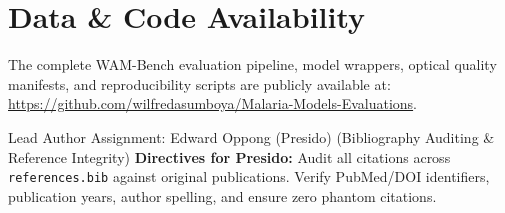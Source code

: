 \documentclass[a4paper,11pt]{article}
\begin{document}
\section*{Data \& Code Availability}
The complete WAM-Bench evaluation pipeline, model wrappers, optical quality manifests, and reproducibility scripts are publicly available at: \url{https://github.com/wilfredasumboya/Malaria-Models-Evaluations}.

\begin{guidebox}{Lead Author Assignment: Edward Oppong (Presido) (Bibliography Auditing \& Reference Integrity)}
\textbf{Directives for Presido:} Audit all citations across \texttt{references.bib} against original publications. Verify PubMed/DOI identifiers, publication years, author spelling, and ensure zero phantom citations.
\end{guidebox}

\vspace{0.4em}



\end{document}
